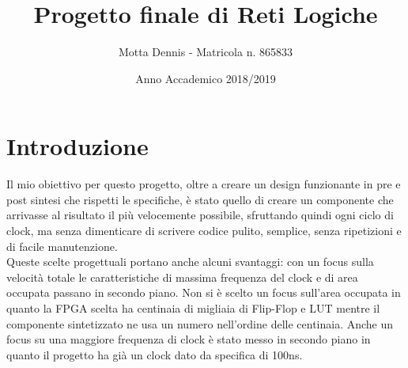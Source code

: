 \documentclass{article}
\title{Progetto finale di Reti Logiche}
\author{Motta Dennis - Matricola n. 865833}
\date{Anno Accademico 2018/2019}
\begin{document}
\maketitle
\tableofcontents

\pagebreak
\section{Introduzione}
Il mio obiettivo per questo progetto, oltre a creare un design funzionante in pre e post sintesi che rispetti le specifiche, è stato quello di creare un componente che arrivasse al risultato il più velocemente possibile, sfruttando quindi ogni ciclo di clock, ma senza dimenticare di scrivere codice pulito, semplice, senza ripetizioni e di facile manutenzione.\\
Queste scelte progettuali portano anche alcuni svantaggi: con un focus sulla velocità totale le caratteristiche di massima frequenza del clock e di area occupata passano in secondo piano. Non si è scelto un focus sull'area occupata in quanto la FPGA scelta ha centinaia di migliaia di Flip-Flop e LUT mentre il componente sintetizzato ne usa un numero nell'ordine delle centinaia. Anche un focus su una maggiore frequenza di clock è stato messo in secondo piano in quanto il progetto ha già un clock dato da specifica di 100ns.
\end{document}
